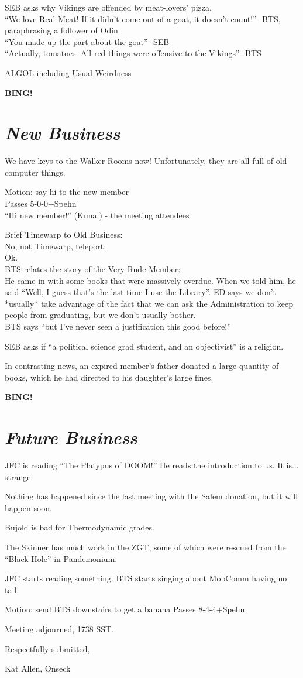 \documentclass[10pt]{article}
\newcommand{\bing}{{\bf BING!} }
\newcommand{\goto}[1]{\bing \vskip 12pt \section*{{\em{#1}}}}
\begin{document}
SEB asks why Vikings are offended by meat-lovers' pizza.\\
``We love Real Meat! If it didn't come out of a goat, it doesn't
count!'' -BTS, paraphrasing a follower of Odin\\
``You made up the part about the goat'' -SEB\\
``Actually, tomatoes. All red things were offensive to the Vikings''
-BTS

ALGOL including Usual Weirdness


\goto{New Business}

We have keys to the Walker Rooms now! Unfortunately, they are all full
of old computer things.

Motion: say hi to the new member\\
Passes 5-0-0+Spehn\\
``Hi new member!'' (Kunal) - the meeting attendees

Brief Timewarp to Old Business:\\
No, not Timewarp, teleport:\\
Ok.\\

BTS relates the story of the Very Rude Member:\\
He came in with some books that were massively overdue. When we told
him, he said ``Well, I guess that's the last time I use the Library''.
ED says we don't *usually* take advantage of the fact that we can ask
the Administration to keep people from graduating, but we don't
usually bother. \\
BTS says ``but I've never seen a justification this good before!''

SEB asks if ``a political science grad student, and an objectivist''
is a religion. 

In contrasting news, an expired  member's father donated a large
quantity of books, which he had directed to his daughter's large fines.

\goto{Future Business}

JFC is reading ``The Platypus of DOOM!'' He reads the introduction to
us. It is... strange.

Nothing has happened since the last meeting with the Salem donation,
but it will happen soon.

Bujold is bad for Thermodynamic grades.

The Skinner has much work in the ZGT, some of which were rescued from
the ``Black Hole'' in Pandemonium.

JFC starts reading something.
BTS starts singing about MobComm having no tail.

Motion: send BTS downstairs to get a banana
Passes 8-4-4+Spehn

\vspace{12pt}

\noindent
Meeting adjourned, 1738 SST.

\vspace{18pt}

\centerline{Respectfully submitted,}
\centerline{Kat Allen,  Onseck}
\end{document}
